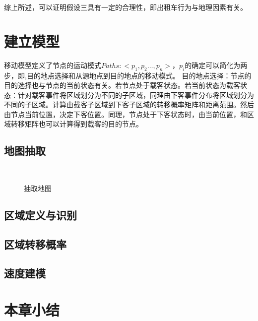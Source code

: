 综上所述，可以证明假设三具有一定的合理性，即出租车行为与地理因素有关。


\section{建立模型}

移动模型定义了节点的运动模式$Paths:<p_1,p_2…,p_n>$，$p_i$的确定可以简化为两步，即,目的地点选择和从源地点到目的地点的移动模式。
目的地点选择：节点的目的选择也与节点的当前状态有关。若节点处于载客状态。若当前状态为载客状态：针对载客事件将区域划分为不同的子区域，同理由下客事件分布将区域划分为不同的子区域。计算由载客子区域到下客子区域的转移概率矩阵和距离范围。然后由节点当前位置，决定下客位置。同理，节点处于下客状态时，由当前位置，和区域转移矩阵也可以计算得到载客的目的节点。

\subsection{地图抽取}

\begin{figure}[!h]
\centering
{}\\
\caption{抽取地图}\label{figure_map}
\end{figure}


\subsection{区域定义与识别}


\subsection{区域转移概率}


\subsection{速度建模}


\section{本章小结}

